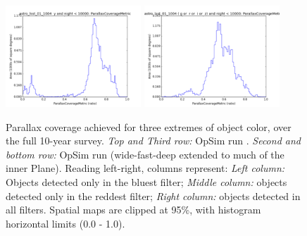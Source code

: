 \begin{figure}[ht]
\begin{center}
  \includegraphics[width=2.0in]{./figs/milkyway/astromPanels/MW_Astrom_paCovge_wfdPlane_y_hst.png}
  \includegraphics[width=2.0in]{./figs/milkyway/astromPanels/MW_Astrom_paCovge_wfdPlane_10y_hst.png}
  \end{center}
  \caption{Parallax coverage achieved for three extremes of object color, over the full 10-year survey. {\it Top and Third row:} OpSim run . {\it Second and bottom row:} OpSim run  (wide-fast-deep extended to much of the inner Plane). Reading left-right, columns represent: {\it Left column:} Objects detected only in the bluest filter; {\it Middle column:} objects detected only in the reddest filter; {\it Right column:} objects detected in all filters. Spatial maps are clipped at 95\%, with histogram horizontal limits (0.0 - 1.0).}
  \label{fig_astrom_ByFilter_PACoverage}
\end{figure}

